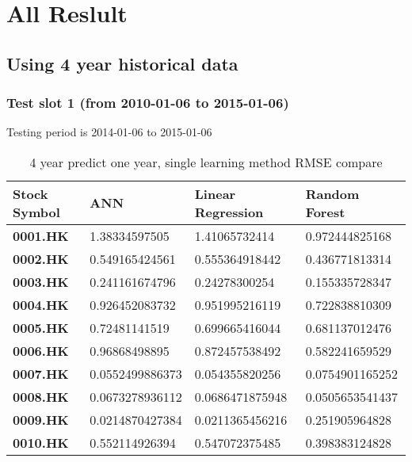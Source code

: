 \chapter{All Reslult}
\label{ch:all_result}
\section{Using 4 year historical data}

\subsection{Test slot 1 (from 2010-01-06 to 2015-01-06)}
Testing period is 2014-01-06 to 2015-01-06
\begin{table}[h]
	\centering
	\begin{tabular}{|l|l|l|l|}
		\hline
		\textbf{Stock Symbol} & \textbf{ANN} & \textbf{Linear Regression} & \textbf{Random Forest} \\ \hline
		\textbf{0001.HK} & 1.38334597505 & 1.41065732414 & 0.972444825168 \\ \hline
		\textbf{0002.HK} & 0.549165424561 & 0.555364918442 & 0.436771813314 \\ \hline
		\textbf{0003.HK} & 0.241161674796 & 0.24278300254 & 0.155335728347 \\ \hline
		\textbf{0004.HK} & 0.926452083732 & 0.951995216119 & 0.722838810309 \\ \hline
		\textbf{0005.HK} & 0.72481141519 & 0.699665416044 & 0.681137012476 \\ \hline
		\textbf{0006.HK} & 0.96868498895 & 0.872457538492 & 0.582241659529 \\ \hline
		\textbf{0007.HK} & 0.0552499886373 & 0.054355820256 & 0.0754901165252 \\ \hline
		\textbf{0008.HK} & 0.0673278936112 & 0.0686471875948 & 0.0505653541437 \\ \hline
		\textbf{0009.HK} & 0.0214870427384 & 0.0211365456216 & 0.251905964828 \\ \hline
		\textbf{0010.HK} & 0.552114926394 & 0.547072375485 & 0.398383124828 \\ \hline
	\end{tabular}
	\caption{4 year predict one year, single learning method RMSE compare}
	\label{tb:rmse201020151}
\end{table}


